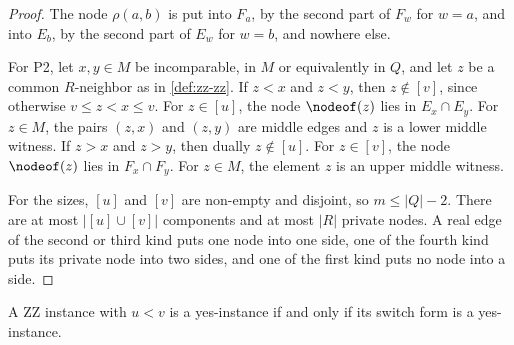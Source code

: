 \begin{proof}
The node $\rho(a, b)$ is put into $F_a$, by the second part of $F_w$ for $w = a$, and into $E_b$, by the second part of $E_w$ for $w = b$, and nowhere else.

For P2, let $x, y \in M$ be incomparable, in $M$ or equivalently in $Q$, and let $z$ be a common $R$-neighbor as in \cref{def:zz-zz}.
If $z < x$ and $z < y$, then $z \notin [v]$, since otherwise $v \leq z < x \leq v$.
For $z \in [u]$, the node $\nodeof(z)$ lies in $E_x \cap E_y$.
For $z \in M$, the pairs $(z, x)$ and $(z, y)$ are middle edges and $z$ is a lower middle witness.
If $z > x$ and $z > y$, then dually $z \notin [u]$.
For $z \in [v]$, the node $\nodeof(z)$ lies in $F_x \cap F_y$.
For $z \in M$, the element $z$ is an upper middle witness.

For the sizes, $[u]$ and $[v]$ are non-empty and disjoint, so $m \leq |Q| - 2$.
There are at most $|[u] \cup [v]|$ components and at most $|R|$ private nodes.
A real edge of the second or third kind puts one node into one side, one of the fourth kind puts its private node into two sides, and one of the first kind puts no node into a side.
\end{proof}

\begin{lemma}
\label{lem:zz-answers}
A ZZ instance with $u < v$ is a yes-instance if and only if its switch form is a yes-instance.
\end{lemma}

